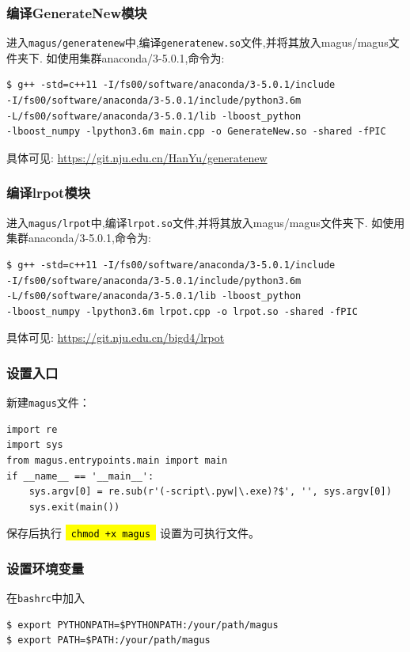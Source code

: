 \documentclass[12pt]{article}
\newcommand{\code}[1]{
  \begingroup
  \sethlcolor{Seashell}
  {\hl{\texttt{~#1~}}}
  \endgroup
}
\newcommand{\file}[1]{\texttt{#1}}
\begin{document}
\subsubsection{编译GenerateNew模块}
进入\file{magus/generatenew}中,编译\file{generatenew.so}文件,并将其放入magus/magus文件夹下.
如使用集群anaconda/3-5.0.1,命令为:
\begin{tcolorbox}
    \begin{verbatim}
$ g++ -std=c++11 -I/fs00/software/anaconda/3-5.0.1/include 
-I/fs00/software/anaconda/3-5.0.1/include/python3.6m 
-L/fs00/software/anaconda/3-5.0.1/lib -lboost_python 
-lboost_numpy -lpython3.6m main.cpp -o GenerateNew.so -shared -fPIC
    \end{verbatim}
\end{tcolorbox}
具体可见:
\textcolor{blue}{\url{https://git.nju.edu.cn/HanYu/generatenew}}
\subsubsection{编译lrpot模块}
进入\file{magus/lrpot}中,编译\file{lrpot.so}文件,并将其放入magus/magus文件夹下.
如使用集群anaconda/3-5.0.1,命令为:
\begin{tcolorbox}
    \begin{verbatim}
$ g++ -std=c++11 -I/fs00/software/anaconda/3-5.0.1/include 
-I/fs00/software/anaconda/3-5.0.1/include/python3.6m 
-L/fs00/software/anaconda/3-5.0.1/lib -lboost_python 
-lboost_numpy -lpython3.6m lrpot.cpp -o lrpot.so -shared -fPIC
\end{verbatim}
\end{tcolorbox}
具体可见:
\textcolor{blue}{\url{https://git.nju.edu.cn/bigd4/lrpot}}
\subsubsection{设置入口}
新建\file{magus}文件：
\begin{tcolorbox}
    \begin{verbatim}
import re
import sys
from magus.entrypoints.main import main
if __name__ == '__main__':
    sys.argv[0] = re.sub(r'(-script\.pyw|\.exe)?$', '', sys.argv[0])
    sys.exit(main())
    \end{verbatim}
\end{tcolorbox}
保存后执行\code{chmod +x magus}设置为可执行文件。
\subsubsection{设置环境变量}
在\file{bashrc}中加入
\begin{tcolorbox}
    \begin{verbatim}
$ export PYTHONPATH=$PYTHONPATH:/your/path/magus
$ export PATH=$PATH:/your/path/magus
    \end{verbatim}
\end{tcolorbox}
\end{document}
